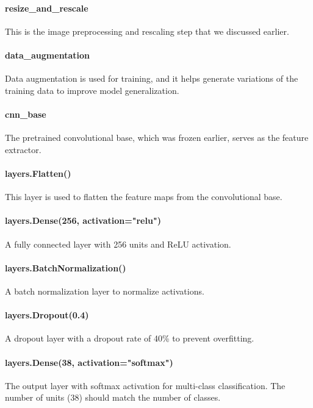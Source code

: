 \paragraph{resize\_and\_rescale} This is the image preprocessing and rescaling step that we discussed earlier.

\paragraph{data\_augmentation} Data augmentation is used for training, and it helps generate variations of the 
	training data to improve model generalization.

\paragraph{cnn\_base} The pretrained convolutional base, which was frozen earlier, serves as the feature extractor.

\paragraph{layers.Flatten()} This layer is used to flatten the feature maps from the convolutional base.

\paragraph{layers.Dense(256, activation="relu")} A fully connected layer with 256 units and ReLU activation.

\paragraph{layers.BatchNormalization()} A batch normalization layer to normalize activations.

\paragraph{layers.Dropout(0.4)} A dropout layer with a dropout rate of 40\% to prevent overfitting.

\paragraph{layers.Dense(38, activation="softmax")} The output layer with softmax activation for multi-class classification. 
	The number of units (38) should match the number of classes.

